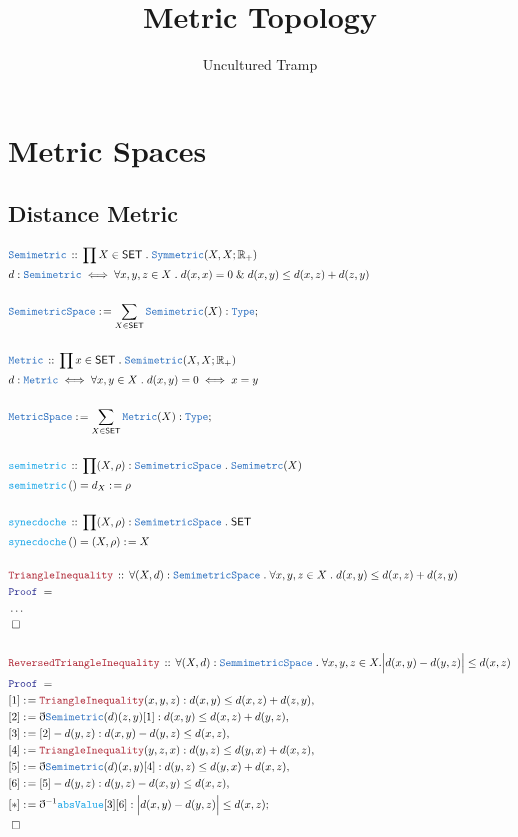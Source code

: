\documentclass[12pt]{scrartcl}
\author{Uncultured Tramp}
\title{Metric Topology}
\newcommand{\TYPE}[1]{\textcolor{NavyBlue}{\mathtt{#1}}}
\newcommand{\FUNC}[1]{\textcolor{Cerulean}{\mathtt{#1}}}
\newcommand{\LOGIC}[1]{\textcolor{Blue}{\mathtt{#1}}}
\newcommand{\THM}[1]{\textcolor{Maroon}{\mathtt{#1}}}
\renewcommand{\.}{\; . \;}
\newcommand{\de}{: \kern 0.1pc =}
\newcommand{\Act}[1]{\left( #1 \right)}
\newcommand{\Theorem}[2]{& \THM{#1} \, :: \, #2 \\ & \Proof = \\ }
\newcommand{\DeclareType}[2]{& \TYPE{#1} \, :: \, #2 \\}
\newcommand{\DefineType}[3]{& #1 : \TYPE{#2} \iff #3 \\}
\newcommand{\DeclareFunc}[2]{& \FUNC{#1} \, :: \, #2 \\}
\newcommand{\DefineNamedFunc}[4]{&  \FUNC{#1}\Act{#2} = #3 \de #4 \\}
\newcommand{\Page}[1]{ \begin{align*} #1 \end{align*}   }
\newcommand{ \bd }{ \ByDef }
\newcommand{\NoProof}{ & \ldots \\ \EndProof}
\renewcommand{\And}{\; \& \;}
\newcommand{\Type}{\TYPE{Type}}
\newcommand{\Reals}{\mathbb{R} }
\newcommand{\Say}[3]{& #1 \de #2 : #3, \\}
\newcommand{\Conclude}[3]{& #1 \de #2 : #3; \\}
\newcommand{\QED}{\; \square}
\newcommand{\EndProof}{& \QED \\}
\newcommand{\ByDef}{\eth}
\newcommand{\Proof}{\LOGIC{Proof} \; }
\newcommand{\SET}{\mathsf{SET}}
\begin{document}
\maketitle
\newpage
\tableofcontents
\newpage
\section{Metric Spaces}
\subsection{Distance Metric}
\Page{
	\DeclareType{Semimetric}{\prod X \in \SET \. \TYPE{Symmetric}(X,X;\Reals_+)}
	\DefineType{d}{Semimetric}{\forall x,y,z \in X \. d(x,x) = 0 \And d(x,y) \le d(x,z) + d(z,y) }
	\\
	\Conclude{\TYPE{SemimetricSpace}}{\sum_{X \in \SET} \TYPE{Semimetric}(X)}{\Type}
	\\
	\DeclareType{Metric}{\prod x \in \SET \. \TYPE{Semimetric}(X,X;\Reals_+)}
	\DefineType{d}{Metric}{\forall x,y \in X \. d(x,y) = 0 \iff x = y }
	\\
	\Conclude{\TYPE{MetricSpace}}{\sum_{X \in \SET} \TYPE{Metric}(X)}{\Type}
	\\
	\DeclareFunc{semimetric}{ \prod (X,\rho) : \TYPE{SemimetricSpace} \. \TYPE{Semimetrc}(X)  }
	\DefineNamedFunc{semimetric}{}{d_X}{\rho}
	\\
	\DeclareFunc{synecdoche}{\prod (X,\rho) : \TYPE{SemimetricSpace} \. \SET}
	\DefineNamedFunc{synecdoche}{}{(X,\rho)}{X}
	\\
	\Theorem{TriangleInequality}{\forall (X,d) : \TYPE{SemimetricSpace} \. \forall x,y,z \in X \. d(x,y) \le d(x,z) + d(z,y) }
	\NoProof
	\\
	\Theorem{ReversedTriangleInequality}
	{
		\forall (X,d) : \TYPE{SemmimetricSpace} \. \forall x,y,z \in X .  \Big|d(x,y) -  d(y,z) \Big| \le d(x,z)
	}
	\Say{[1]}{\THM{TriangleInequality}(x,y,z)}{d(x,y) \le d(x,z) + d(z,y)}
	\Say{[2]}{\bd \TYPE{Semimetric}(d)(z,y)[1]}{d(x,y) \le d(x,z) + d(y,z)}
	\Say{[3]}{  [2] - d(y,z)    }{d(x,y) - d(y,z) \le d(x,z)}
	\Say{[4]}{\THM{TriangleInequality}(y,z,x)}{d(y,z) \le d(y,x) + d(x,z)}
	\Say{[5]}{\bd \TYPE{Semimetric}(d)(x,y)[4]}{d(y,z) \le d(y,x) + d(x,z)}
	\Say{[6]}{  [5] - d(y,z)    }{d(y,z) - d(x,y) \le d(x,z)}
	\Conclude{[*]}{\bd^{-1} \FUNC{absValue}[3][6]}{ \Big| d(x,y) - d(y,z) \Big| \le d(x,z)  }
	\EndProof
}
\end{document}
